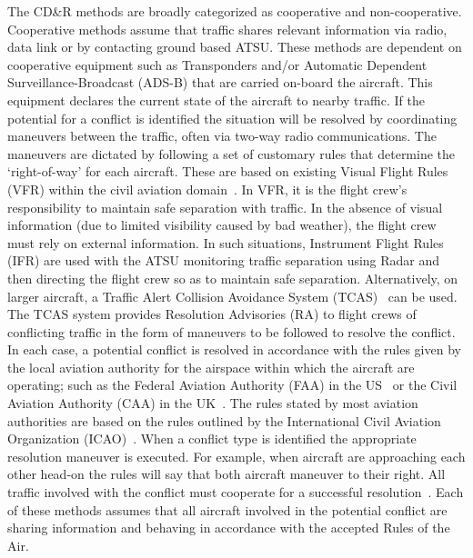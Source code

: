 \documentclass[journal]{IEEEtran}
\begin{document}
The CD\&R methods are broadly categorized as cooperative and non-cooperative. Cooperative methods assume that traffic shares relevant information via radio, data link or by contacting ground based ATSU. These methods are dependent on cooperative equipment such as Transponders and/or Automatic Dependent Surveillance-Broadcast (ADS-B) that are carried on-board the aircraft. This equipment declares the current state of the aircraft to nearby traffic. If the potential for a conflict is identified the situation will be resolved by coordinating maneuvers between the traffic, often via two-way radio communications. The maneuvers are dictated by following a set of customary rules that determine the ‘right-of-way’ for each aircraft. These are based on existing Visual Flight Rules (VFR) within the civil aviation domain~\cite{ICAOannex2}. In VFR, it is the flight crew's responsibility to maintain safe separation with traffic. In the absence of visual information (due to limited visibility caused by bad weather), the flight crew must rely on external information. In such situations, Instrument Flight Rules (IFR) are used with the ATSU monitoring traffic separation using Radar and then directing the flight crew so as to maintain safe separation. Alternatively, on larger aircraft, a Traffic Alert Collision Avoidance System (TCAS)~\cite{kuchar2007traffic} can be used. The TCAS system provides Resolution Advisories (RA) to flight crews of conflicting traffic in the form of maneuvers to be followed to resolve the conflict. In each case, a potential conflict is resolved in accordance with the rules given by the local aviation authority for the airspace within which the aircraft are operating; such as the Federal Aviation Authority (FAA) in the US~\cite{authority2015FAA} or the Civil Aviation Authority (CAA) in the UK~\cite{authority2015cap}. The rules stated by most aviation authorities are based on the rules outlined by the International Civil Aviation Organization (ICAO)~\cite{ICAOannex1to18}. When a conflict type is identified the appropriate resolution maneuver is executed. For example, when aircraft are approaching each other head-on the rules will say that both aircraft maneuver to their right. All traffic involved with the conflict must cooperate for a successful resolution~\cite{mishra2013doing}. Each of these methods assumes that all aircraft involved in the potential conflict are sharing information and behaving in accordance with the accepted Rules of the Air. 
\end{document}
